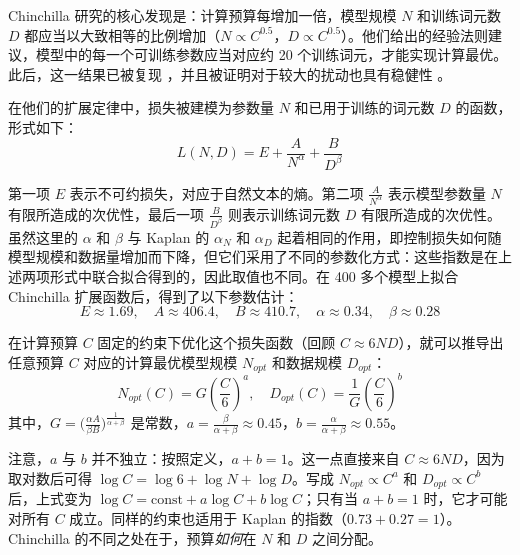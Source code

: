 Chinchilla 研究的核心发现是：计算预算每增加一倍，模型规模 $N$ 和训练词元数 $D$ 都应当以大致相等的比例增加（$N \propto C^{0.5}$，$D \propto C^{0.5}$）。他们给出的经验法则建议，模型中的每一个可训练参数应当对应约 20 个训练词元，才能实现计算最优。此后，这一结果已被复现 \citep{besiroglu2024chinchilla}，并且被证明对于较大的扰动也具有稳健性 \citep{schaeffer2025evaluating}。

在他们的扩展定律中，损失被建模为参数量 $N$ 和已用于训练的词元数 $D$ 的函数，形式如下：
\begin{equation}
    L(N,D) = E + \frac{A}{N^{\alpha}} + \frac{B}{D^{\beta}}
\end{equation}

第一项 $E$ 表示不可约损失，对应于自然文本的熵。第二项 $\frac{A}{N^{\alpha}}$ 表示模型参数量 $N$ 有限所造成的次优性，最后一项 $\frac{B}{D^{\beta}}$ 则表示训练词元数 $D$ 有限所造成的次优性。虽然这里的 $\alpha$ 和 $\beta$ 与 Kaplan 的 $\alpha_N$ 和 $\alpha_D$ 起着相同的作用，即控制损失如何随模型规模和数据量增加而下降，但它们采用了不同的参数化方式：这些指数是在上述两项形式中联合拟合得到的，因此取值也不同。在 400 多个模型上拟合 Chinchilla 扩展函数后，得到了以下参数估计：
\begin{equation}
    E \approx 1.69, \quad A \approx 406.4, \quad B \approx 410.7, \quad \alpha \approx 0.34, \quad \beta \approx 0.28
\end{equation}

在计算预算 $C$ 固定的约束下优化这个损失函数（回顾 $C \approx 6ND$），就可以推导出任意预算 $C$ 对应的计算最优模型规模 $N_{opt}$ 和数据规模 $D_{opt}$：
\begin{equation}
    N_{opt}(C) = G \left( \frac{C}{6} \right)^a, \quad D_{opt}(C) = \frac{1}{G} \left( \frac{C}{6} \right)^b
\end{equation}
其中，$G=\big(\frac{\alpha A}{\beta B}\big)^{\frac{1}{\alpha + \beta}}$ 是常数，$a = \frac{\beta}{\alpha + \beta} \approx 0.45$，$b = \frac{\alpha}{\alpha + \beta} \approx 0.55$。

注意，$a$ 与 $b$ 并不独立：按照定义，$a+b=1$。这一点直接来自 $C \approx 6ND$，因为取对数后可得 $\log C = \log 6 + \log N + \log D$。写成 $N_{opt} \propto C^a$ 和 $D_{opt} \propto C^b$ 后，上式变为 $\log C = \text{const} + a \log C + b \log C$；只有当 $a+b=1$ 时，它才可能对所有 $C$ 成立。同样的约束也适用于 Kaplan 的指数（$0.73 + 0.27 = 1$）。Chinchilla 的不同之处在于，预算\emph{如何}在 $N$ 和 $D$ 之间分配。

